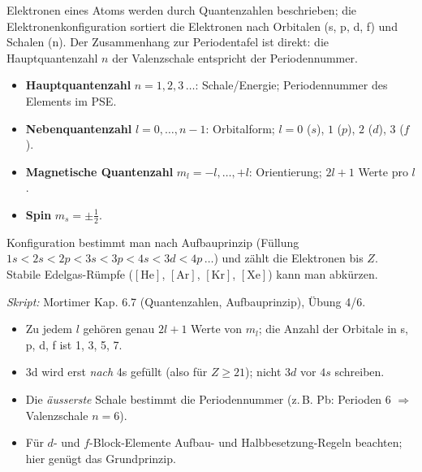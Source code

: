 

Elektronen eines Atoms werden durch Quantenzahlen beschrieben; die
Elektronenkonfiguration sortiert die Elektronen nach Orbitalen (s, p, d, f)
und Schalen (n). Der Zusammenhang zur Periodentafel ist direkt: die
Hauptquantenzahl $n$ der Valenzschale entspricht der Periodennummer.

\begin{werkzeugkasten}[Quantenzahlen]
\begin{itemize}
  \item \textbf{Hauptquantenzahl} $n = 1,2,3\,\dots$: Schale/Energie;
        Periodennummer des Elements im PSE.
  \item \textbf{Nebenquantenzahl} $l = 0,\dots,n-1$: Orbitalform;
        $l=0$ ($s$), $1$ ($p$), $2$ ($d$), $3$ ($f$).
  \item \textbf{Magnetische Quantenzahl} $m_l = -l,\dots,+l$:
        Orientierung; $2l+1$ Werte pro $l$.
  \item \textbf{Spin} $m_s = \pm \tfrac12$.
\end{itemize}
Konfiguration bestimmt man nach Aufbauprinzip (Füllung $1s < 2s < 2p <
3s < 3p < 4s < 3d < 4p \,\dots$) und zählt die Elektronen bis $Z$.
Stabile Edelgas-Rümpfe ($\mathrm{[He]}$, $\mathrm{[Ar]}$, $\mathrm{[Kr]}$,
$\mathrm{[Xe]}$) kann man abkürzen.

\textit{Skript:} Mortimer Kap. 6.7 (Quantenzahlen, Aufbauprinzip), Übung 4/6.
\end{werkzeugkasten}

\begin{achtung}
\begin{itemize}
  \item Zu jedem $l$ gehören genau $2l+1$ Werte von $m_l$; die Anzahl der
        Orbitale in s, p, d, f ist 1, 3, 5, 7.
  \item 3d wird erst \emph{nach} 4s gefüllt (also für $Z\ge 21$); nicht
        $3d$ vor $4s$ schreiben.
  \item Die \emph{äusserste} Schale bestimmt die Periodennummer (z.\,B.
        Pb: Perioden 6 $\Rightarrow$ Valenzschale $n=6$).
  \item Für $d$- und $f$-Block-Elemente Aufbau- und
        Halbbesetzung-Regeln beachten; hier genügt das Grundprinzip.
\end{itemize}
\end{achtung}

